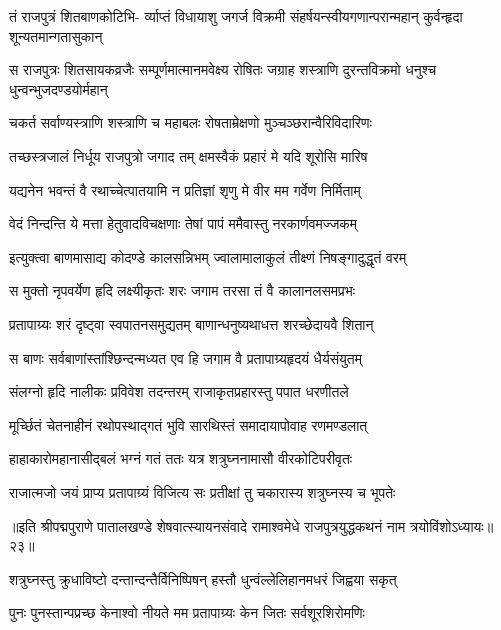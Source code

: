 \fourlineindentedshloka
{तं राजपुत्रं शितबाणकोटिभि-}
{र्व्याप्तं विधायाशु जगर्ज विक्रमी}
{संहर्षयन्स्वीयगणान्परान्महान्}
{कुर्वन्हृदा शून्यतमान्गतासुकान्}%

\fourlineindentedshloka
{स राजपुत्रः शितसायकव्रजैः}
{सम्पूर्णमात्मानमवेक्ष्य रोषितः}
{जग्राह शस्त्राणि दुरन्तविक्रमो}
{धनुश्च धुन्वन्भुजदण्डयोर्महान्}%

\twolineshloka
{चकर्त सर्वाण्यस्त्राणि शस्त्राणि च महाबलः}
{रोषताम्रेक्षणो मुञ्चञ्छरान्वैरिविदारिणः}%

\twolineshloka
{तच्छस्त्रजालं निर्धूय राजपुत्रो जगाद तम्}
{क्षमस्वैकं प्रहारं मे यदि शूरोसि मारिष}%

\twolineshloka
{यद्यनेन भवन्तं वै रथाच्चेत्पातयामि न}
{प्रतिज्ञां शृणु मे वीर मम गर्वेण निर्मिताम्}%

\twolineshloka
{वेदं निन्दन्ति ये मत्ता हेतुवादविचक्षणाः}
{तेषां पापं ममैवास्तु नरकार्णवमज्जकम्}%

\twolineshloka
{इत्युक्त्वा बाणमासाद्य कोदण्डे कालसन्निभम्}
{ज्वालामालाकुलं तीक्ष्णं निषङ्गादुद्धृतं वरम्}%

\twolineshloka
{स मुक्तो नृपवर्येण हृदि लक्ष्यीकृतः शरः}
{जगाम तरसा तं वै कालानलसमप्रभः}%

\twolineshloka
{प्रतापाग्र्यः शरं दृष्ट्वा स्वपातनसमुद्यतम्}
{बाणान्धनुष्यथाधत्त शरच्छेदायवै शितान्}%

\twolineshloka
{स बाणः सर्वबाणांस्तांश्छिन्दन्मध्यत एव हि}
{जगाम वै प्रतापाग्र्यहृदयं धैर्यसंयुतम्}%

\twolineshloka
{संलग्नो हृदि नालीकः प्रविवेश तदन्तरम्}
{राजाकृतप्रहारस्तु पपात धरणीतले}%

\twolineshloka
{मूर्च्छितं चेतनाहीनं रथोपस्थाद्गतं भुवि}
{सारथिस्तं समादायापोवाह रणमण्डलात्}%

\twolineshloka
{हाहाकारोमहानासीद्बलं भग्नं गतं ततः}
{यत्र शत्रुघ्ननामासौ वीरकोटिपरीवृतः}%

\twolineshloka
{राजात्मजो जयं प्राप्य प्रतापाग्र्यं विजित्य सः}
{प्रतीक्षां तु चकारास्य शत्रुघ्नस्य च भूपतेः}%

{॥इति श्रीपद्मपुराणे पातालखण्डे शेषवात्स्यायनसंवादे रामाश्वमेधे राजपुत्रयुद्धकथनं नाम त्रयोविंशोऽध्यायः॥२३॥}

\resetShloka


\twolineshloka
{शत्रुघ्नस्तु क्रुधाविष्टो दन्तान्दन्तैर्विनिष्पिषन्}
{हस्तौ धुन्वंल्लेलिहानमधरं जिह्वया सकृत्}%

\twolineshloka
{पुनः पुनस्तान्पप्रच्छ केनाश्वो नीयते मम}
{प्रतापाग्र्यः केन जितः सर्वशूरशिरोमणिः}%

